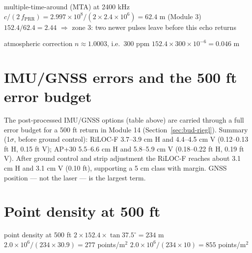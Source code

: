 \begin{worked}{multiple-time-around (MTA) at 2400 kHz}
 $c/(2\,f_{\text{PRR}})=2.997\times10^8/(2\times2.4\times10^6)=62.4$ m (Module 3)
 $152.4/62.4=2.44$ $\Rightarrow$ zone 3: two newer pulses leave before this echo returns
\end{worked}

\begin{worked}{atmospheric correction}
 $n\approx1.0003$, i.e.\ 300 ppm
 $152.4\times300\times10^{-6}=0.046$ m
\end{worked}

\section{IMU/GNSS errors and the 500 ft error budget}
The post-processed IMU/GNSS options (table above) are carried through a full error budget for a 500 ft return in Module 14 (Section~\ref{sec:bud-riegl}). Summary (1$\sigma$, before ground control): RiLOC-F 3.7--3.9 cm H and 4.4--4.5 cm V (0.12--0.13 ft H, 0.15 ft V); AP+30 5.5--6.6 cm H and 5.8--5.9 cm V (0.18--0.22 ft H, 0.19 ft V). After ground control and strip adjustment the RiLOC-F reaches about 3.1 cm H and 3.1 cm V (0.10 ft), supporting a 5 cm class with margin. GNSS position --- not the laser --- is the largest term.

\section{Point density at 500 ft}
\begin{worked}{point density at 500 ft}
 $2\times152.4\times\tan37.5^\circ=234$ m
 $2.0\times10^6/(234\times30.9)=277$ points/m$^2$
 $2.0\times10^6/(234\times10)=855$ points/m$^2$
\end{worked}

